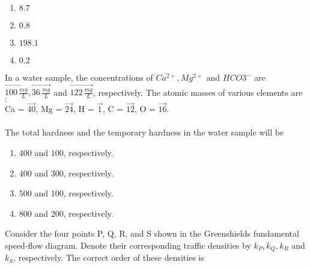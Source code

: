    \begin{enumerate}
        \item $8.7$
        \item $0.8$
        \item $198.1$
        \item $0.2$
    \end{enumerate}
    \item In a water sample, the concentrations of $Ca^{2+}, Mg^{2+}$ and $HCO3^-$ are $\vec{100\,\frac{mg}{L}},\vec{36\,\frac{mg}{L}}$ and $\vec{122\,\frac{mg}{L}}$, respectively. The atomic masses of various elements are $\colon$ \\
    Ca = $\vec{40}$, Mg = $\vec{24}$, H = $\vec{1}$, C = $\vec{12}$, O = $\vec{16}$. \\ \\
    The total hardness and the temporary hardness in the water sample  will be 
    \begin{enumerate}
        \item $400$ and $100$, respectively.
        \item $400$ and $300$, respectively.
        \item $500$ and $100$, respectively.
        \item $800$ and $200$, respectively. 
    \end{enumerate}
    \item Consider the four points P, Q, R, and S shown in the Greenshields fundamental
speed-flow diagram. Denote their corresponding traffic densities by $k_P,k_Q,k_R$ and $k_S$, respectively. The correct order of these densities is 

